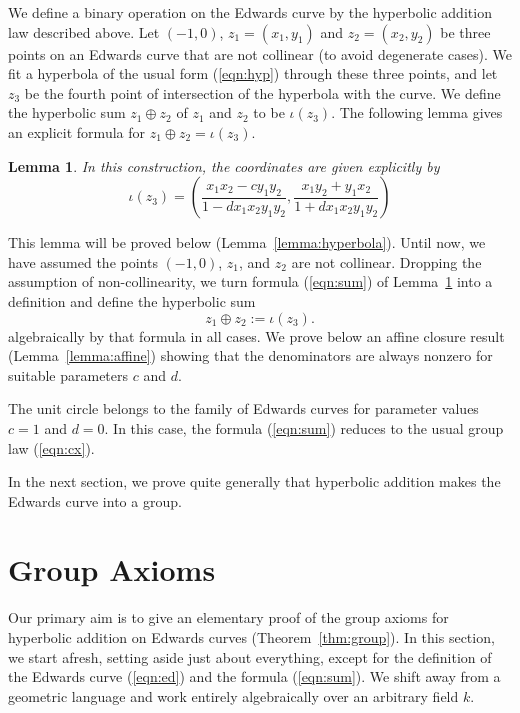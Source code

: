 \documentclass[12pt]{article}
\newtheorem{lemma}[theorem]{Lemma}
\begin{document}
We define a binary operation on the Edwards curve by the hyperbolic
addition law described above.  Let $(-1,0)$, $z_1 = (x_1,y_1)$ and
$z_2=(x_2,y_2)$ be three points on an Edwards curve that are not
collinear (to avoid degenerate cases).  We fit a hyperbola of the
usual form (\ref{eqn:hyp}) through these three points, and let $z_3$
be the fourth point of intersection of the hyperbola with the curve.
We define the hyperbolic sum $z_1\oplus z_2$ of $z_1$ and $z_2$ to be
$\iota(z_3)$.  The following lemma gives an explicit formula for
$z_1\oplus z_2 = \iota(z_3)$.

 
 \begin{lemma}\label{lemma:hyp} 
In this construction, the coordinates are given explicitly by
 \begin{equation}\label{eqn:sum}
 \iota(z_3) = \left(\frac{x_1 x_2 - c y_1 y_2}{1 - d x_1 x_2 y_1 y_2},
\frac{x_1 y_2 + y_1 x_2}{1+d x_1 x_2 y_1 y_2}\right)
 \end{equation}
 \end{lemma}

 This lemma will be proved below (Lemma~\ref{lemma:hyperbola}).  Until
 now, we have assumed the points $(-1,0)$, $z_1$, and $z_2$ are not
 collinear.  Dropping the assumption of non-collinearity, we turn
 formula (\ref{eqn:sum}) of Lemma~\ref{lemma:hyp} into a definition
 and define the hyperbolic sum
\[
 z_1\oplus z_2 := \iota(z_3).
\]
algebraically by that formula in all cases.  We prove below an affine
closure result (Lemma~\ref{lemma:affine}) showing that the
denominators are always nonzero for suitable parameters $c$ and $d$.

The unit circle belongs to the family of Edwards curves for parameter
values $c=1$ and $d=0$.  In this case, the formula (\ref{eqn:sum})
reduces to the usual group law (\ref{eqn:cx}).

In the next section, we prove quite generally that hyperbolic addition
makes the Edwards curve into a group.

\section{Group Axioms}\label{sec:axiom}

Our primary aim is to give an elementary proof of the group axioms for
hyperbolic addition on Edwards curves (Theorem~\ref{thm:group}).  In
this section, we start afresh, setting aside just about everything,
except for the definition of the Edwards curve (\ref{eqn:ed}) and
the formula (\ref{eqn:sum}).  We shift away from
a geometric language and work entirely algebraically over an arbitrary
field $k$.
\end{document}
